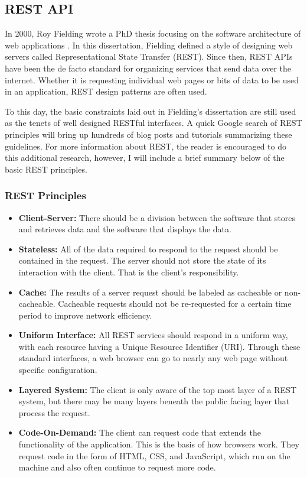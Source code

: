 \subsection{REST API}
In 2000, Roy Fielding wrote a PhD thesis focusing on the software architecture of web applications \cite{fieldingArchitecturalStylesDesign2000}.  In this dissertation, Fielding defined a style of designing web servers called Representational State Transfer (REST).  Since then, REST APIs have been the de facto standard for organizing services that send data over the internet.  Whether it is requesting individual web pages or bits of data to be used in an application, REST design patterns are often used. 

To this day, the basic constraints laid out in Fielding's dissertation are still used as the tenets of well designed RESTful interfaces.  A quick Google search of REST principles will bring up hundreds of blog posts and tutorials summarizing these guidelines. For more information about REST, the reader is encouraged to do this additional research, however, I will include a brief summary below of the basic REST principles.

\subsubsection{REST Principles}

\begin{itemize}
    \item \textbf{Client-Server:} There should be a division between the software that stores and retrieves data and the software that displays the data.
    \item \textbf{Stateless:} All of the data required to respond to the request should be contained in the request. The server should not store the state of its interaction with the client. That is the client's responsibility.
    \item \textbf{Cache:} The results of a server request should be labeled as cacheable or non-cacheable.  Cacheable requests should not be re-requested for a certain time period to improve network efficiency.
    \item \textbf{Uniform Interface:} All REST services should respond in a uniform way, with each resource having a Unique Resource Identifier (URI).  Through these standard interfaces, a web browser can go to nearly any web page without specific configuration.
    \item \textbf{Layered System:} The client is only aware of the top most layer of a REST system, but there may be many layers beneath the public facing layer that process the request.
    \item \textbf{Code-On-Demand:} The client can request code that extends the functionality of the application.  This is the basis of how browsers work.  They request code in the form of HTML, CSS, and JavaScript, which run on the machine and also often continue to request more code.
\end{itemize}

